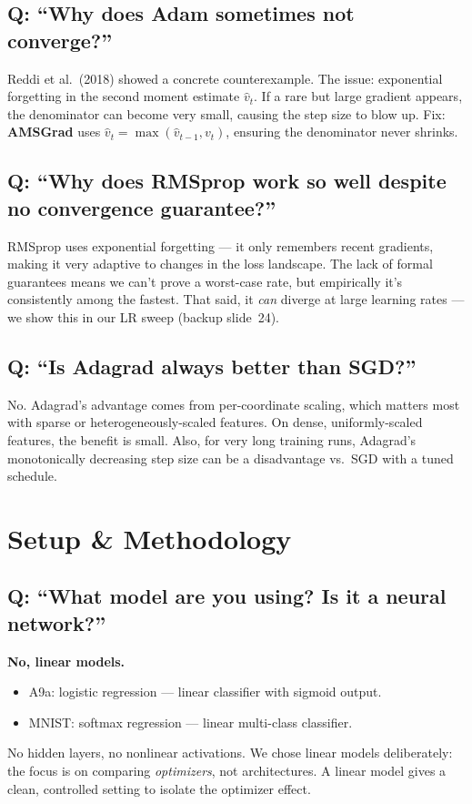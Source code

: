 \documentclass[10pt,a4paper]{article}
\begin{document}
\subsection{Q: ``Why does Adam sometimes not converge?''}
Reddi et al.\ (2018) showed a concrete counterexample.
The issue: exponential forgetting in the second moment estimate $\hat{v}_t$.
If a rare but large gradient appears, the denominator can become very small, causing the step size to blow up.
Fix: \textbf{AMSGrad} uses $\hat{v}_t = \max(\hat{v}_{t-1}, v_t)$, ensuring the denominator never shrinks.

\subsection{Q: ``Why does RMSprop work so well despite no convergence guarantee?''}
RMSprop uses exponential forgetting --- it only remembers recent gradients, making it very adaptive to changes in the loss landscape.
The lack of formal guarantees means we can't prove a worst-case rate, but empirically it's consistently among the fastest.
That said, it \emph{can} diverge at large learning rates --- we show this in our LR sweep (backup slide~24).

\subsection{Q: ``Is Adagrad always better than SGD?''}
No. Adagrad's advantage comes from per-coordinate scaling, which matters most with sparse or heterogeneously-scaled features.
On dense, uniformly-scaled features, the benefit is small.
Also, for very long training runs, Adagrad's monotonically decreasing step size can be a disadvantage vs.\ SGD with a tuned schedule.

\section{Setup \& Methodology}

\subsection{Q: ``What model are you using? Is it a neural network?''}
\textbf{No, linear models.}
\begin{itemize}[nosep]
  \item A9a: logistic regression --- linear classifier with sigmoid output.
  \item MNIST: softmax regression --- linear multi-class classifier.
\end{itemize}
No hidden layers, no nonlinear activations.
We chose linear models deliberately: the focus is on comparing \emph{optimizers}, not architectures.
A linear model gives a clean, controlled setting to isolate the optimizer effect.
\end{document}
